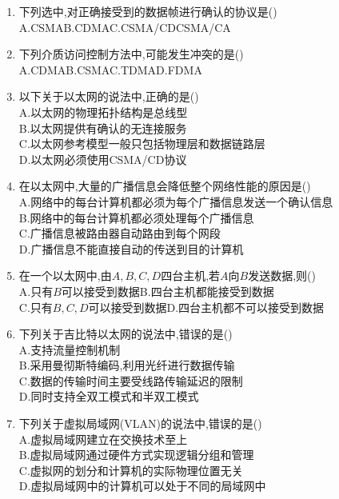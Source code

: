 \documentclass[12pt, a4paper, oneside, UTF8]{ctexbook}
\begin{document}
\begin{enumerate}
    \item \bt 下列选中,对正确接受到的数据帧进行确认的协议是()\\
    A.CSMA\qquad B.CDMA\qquad C.CSMA/CD\qquad CSMA/CA 

    \item \bt 下列介质访问控制方法中,可能发生冲突的是() \\
    A.CDMA\qquad B.CSMA\qquad C.TDMA\qquad D.FDMA

    \item 以下关于以太网的说法中,正确的是() \\
    A.以太网的物理拓扑结构是总线型 \\
    B.以太网提供有确认的无连接服务 \\
    C.以太网参考模型一般只包括物理层和数据链路层 \\
    D.以太网必须使用CSMA/CD协议

    \item 在以太网中,大量的广播信息会降低整个网络性能的原因是() \\
    A.网络中的每台计算机都必须为每个广播信息发送一个确认信息 \\
    B.网络中的每台计算机都必须处理每个广播信息 \\
    C.广播信息被路由器自动路由到每个网段 \\
    D.广播信息不能直接自动的传送到目的计算机 

    \item 在一个以太网中,由$A,B,C,D$四台主机,若$A$向$B$发送数据,则() \\
    A.只有$B$可以接受到数据\qquad B.四台主机都能接受到数据 \\
    C.只有$B,C,D$可以接受到数据\qquad D.四台主机都不可以接受到数据 

    \item 下列关于吉比特以太网的说法中,错误的是() \\
    A.支持流量控制机制 \\
    B.采用曼彻斯特编码,利用光纤进行数据传输 \\
    C.数据的传输时间主要受线路传输延迟的限制 \\
    D.同时支持全双工模式和半双工模式 
    
    \item 下列关于虚拟局域网(VLAN)的说法中,错误的是() \\
    A.虚拟局域网建立在交换技术至上 \\
    B.虚拟局域网通过硬件方式实现逻辑分组和管理\\
    C.虚拟网的划分和计算机的实际物理位置无关 \\
    D.虚拟局域网中的计算机可以处于不同的局域网中
    

\end{enumerate}
\end{document}
